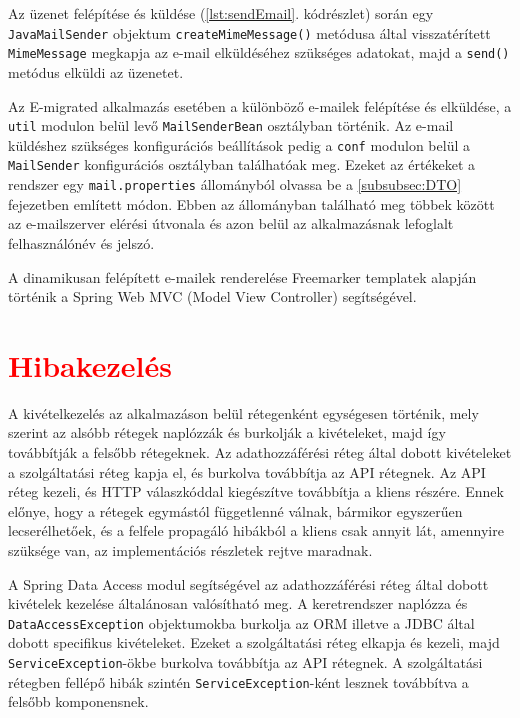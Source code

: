 \begin{reviewed}
Az üzenet felépítése és küldése (\ref{lst:sendEmail}. kódrészlet) során egy \texttt{JavaMailSender} objektum \texttt{createMimeMessage()} metódusa által visszatérített \texttt{MimeMessage} megkapja az e-mail elküldéséhez szükséges adatokat, majd a \texttt{send()} metódus elküldi az üzenetet. 

Az E-migrated alkalmazás esetében a különböző e-mailek felépítése és elküldése, a \texttt{util} modulon belül levő \texttt{MailSenderBean} osztályban történik. Az e-mail küldéshez szükséges konfigurációs beállítások pedig a \texttt{conf} modulon belül a \texttt{MailSender} konfigurációs osztályban találhatóak meg. Ezeket az értékeket a rendszer egy \texttt{mail.properties} állományból olvassa be a \ref{subsubsec:DTO} fejezetben említett módon. Ebben az állományban található meg többek között az e-mailszerver elérési útvonala és azon belül az alkalmazásnak lefoglalt felhasználónév és jelszó.

A dinamikusan felépített e-mailek renderelése Freemarker templatek alapján történik a Spring Web MVC (Model View Controller) segítségével.
\end{reviewed}


\section{\textcolor{red}{Hibakezelés}}
\label{sec:hibakezeles}
A kivételkezelés az alkalmazáson belül rétegenként egységesen történik, mely szerint az alsóbb rétegek naplózzák és burkolják a kivételeket, majd így továbbítják a felsőbb rétegeknek. Az adathozzáférési réteg által dobott kivételeket a szolgáltatási réteg kapja el, és burkolva továbbítja az API rétegnek. Az API réteg kezeli, és HTTP válaszkóddal kiegészítve továbbítja a kliens részére. Ennek előnye, hogy a rétegek egymástól függetlenné válnak, bármikor egyszerűen lecserélhetőek, és a felfele propagáló hibákból a kliens csak annyit lát, amennyire szüksége van, az implementációs részletek rejtve maradnak. 

A Spring Data Access modul segítségével az adathozzáférési réteg által dobott kivételek kezelése általánosan valósítható meg. A keretrendszer naplózza és \texttt{DataAccessException} objektumokba burkolja az ORM illetve a JDBC által dobott specifikus kivételeket. Ezeket  a szolgáltatási réteg elkapja és kezeli, majd \texttt{ServiceException}-ökbe burkolva továbbítja az API rétegnek. A szolgáltatási rétegben fellépő hibák szintén \texttt{ServiceException}-ként lesznek továbbítva a felsőbb komponensnek. 

